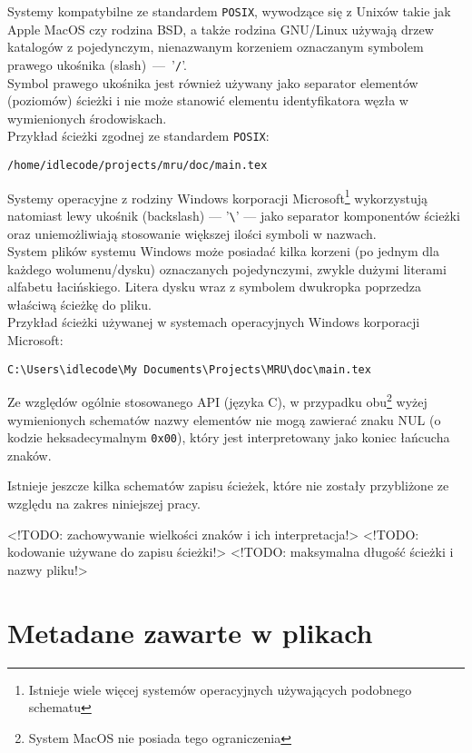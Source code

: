 \par
Systemy kompatybilne ze standardem \texttt{POSIX}, wywodzące się z Unixów takie jak Apple MacOS czy rodzina BSD, a także rodzina GNU/Linux używają drzew katalogów z pojedynczym, nienazwanym korzeniem oznaczanym symbolem prawego ukośnika (slash)~---~'\texttt{/}'.\\
Symbol prawego ukośnika jest również używany jako separator elementów (poziomów) ścieżki i nie może stanowić elementu identyfikatora węzła w wymienionych środowiskach.\\

Przykład ścieżki zgodnej ze standardem \texttt{POSIX}:
\begin{center}
\texttt{/home/idlecode/projects/mru/doc/main.tex}
\end{center}

\par
Systemy operacyjne z rodziny Windows korporacji Microsoft\footnote{Istnieje wiele więcej systemów operacyjnych używających podobnego schematu} wykorzystują natomiast lewy ukośnik (backslash) --- '\texttt{\textbackslash}' --- jako separator komponentów ścieżki oraz uniemożliwiają stosowanie większej ilości symboli w nazwach.\\
System plików systemu Windows może posiadać kilka korzeni (po jednym dla każdego wolumenu/dysku) oznaczanych pojedynczymi, zwykle dużymi literami alfabetu łacińskiego. Litera dysku wraz z symbolem dwukropka poprzedza właściwą ścieżkę do pliku.\\

Przykład ścieżki używanej w systemach operacyjnych Windows korporacji Microsoft:
\begin{center}
\texttt{C:\textbackslash Users\textbackslash idlecode\textbackslash My Documents\textbackslash Projects\textbackslash MRU\textbackslash doc\textbackslash main.tex}
\end{center}

\par
Ze względów ogólnie stosowanego API (języka C), w przypadku obu\footnote{System MacOS nie posiada tego ograniczenia} wyżej wymienionych schematów nazwy elementów nie mogą zawierać znaku NUL (o kodzie heksadecymalnym \texttt{0x00}), który jest interpretowany jako koniec łańcucha znaków.

\par
Istnieje jeszcze kilka schematów zapisu ścieżek, które nie zostały przybliżone ze względu na zakres niniejszej pracy.

<!TODO: zachowywanie wielkości znaków i ich interpretacja!>
<!TODO: kodowanie używane do zapisu ścieżki!>
<!TODO: maksymalna długość ścieżki i nazwy pliku!>

\section{Metadane zawarte w plikach}

\clearpage
